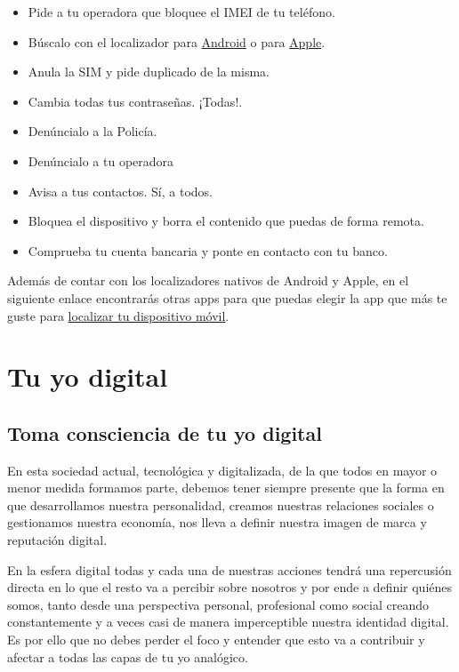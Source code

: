 \documentclass[
  a4paper,
  openany]{book}
\begin{document}
\begin{itemize}
\item
  Pide a tu operadora que bloquee el IMEI de tu teléfono.
\item
  Búscalo con el localizador para \href{https://myaccount.google.com/intro/find-your-phone?hl=es-ES}{Android} o para \href{https://www.apple.com/es/icloud/find-my/}{Apple}.
\item
  Anula la SIM y pide duplicado de la misma.
\item
  Cambia todas tus contraseñas. ¡Todas!.
\item
  Denúncialo a la Policía.
\item
  Denúncialo a tu operadora
\item
  Avisa a tus contactos. Sí, a todos.
\item
  Bloquea el dispositivo y borra el contenido que puedas de forma remota.
\item
  Comprueba tu cuenta bancaria y ponte en contacto con tu banco.
\end{itemize}

Además de contar con los localizadores nativos de Android y Apple, en el siguiente enlace encontrarás otras apps para que puedas elegir la app que más te guste para \href{https://www.osi.es/es/herramientas-gratuitas?herramienta_selec\%5B0\%5D=122}{localizar tu dispositivo móvil}.

\hypertarget{tu-yo-digital}{%
\chapter{Tu yo digital}\label{tu-yo-digital}}

\hypertarget{toma-consciencia-de-tu-yo-digital}{%
\section{Toma consciencia de tu yo digital}\label{toma-consciencia-de-tu-yo-digital}}

En esta sociedad actual, tecnológica y digitalizada, de la que todos en mayor o menor medida formamos parte, debemos tener siempre presente que la forma en que desarrollamos nuestra personalidad, creamos nuestras relaciones sociales o gestionamos nuestra economía, nos lleva a definir nuestra imagen de marca y reputación digital.

En la esfera digital todas y cada una de nuestras acciones tendrá una repercusión directa en lo que el resto va a percibir sobre nosotros y por ende a definir quiénes somos, tanto desde una perspectiva personal, profesional como social creando constantemente y a veces casi de manera imperceptible nuestra identidad digital. Es por ello que no debes perder el foco y entender que esto va a contribuir y afectar a todas las capas de tu yo analógico.
\end{document}
